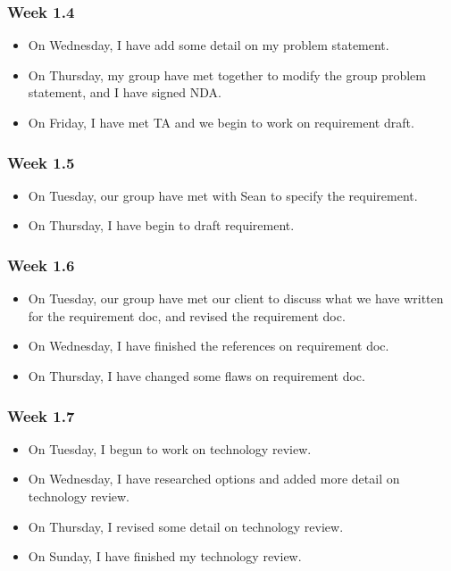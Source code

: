 \documentclass[onecolumn, draftclsnofoot,10pt, compsoc]{article}
\begin{document}
				\subsubsection{Week 1.4}
					\begin{itemize}
					\item On Wednesday, I have add some detail on my problem statement.
					\item On Thursday, my group have met together to modify the group problem statement, and I have signed NDA.
					\item On Friday, I have met TA and we begin to work on requirement draft.
					\end{itemize}
				\subsubsection{Week 1.5}
					\begin{itemize}
					\item On Tuesday, our group have met with Sean to specify the requirement.
					\item On Thursday, I have begin to draft requirement.
					\end{itemize}
				\subsubsection{Week 1.6}
					\begin{itemize}
					\item On Tuesday, our group have met our client to discuss what we have written for the requirement doc, and revised the requirement doc.
					\item On Wednesday, I have finished the references on requirement doc.
					\item On Thursday, I have changed some flaws on requirement doc.
					\end{itemize}
				\subsubsection{Week 1.7}
					\begin{itemize}
					\item On Tuesday, I begun to work on technology review.
					\item On Wednesday, I have researched options and  added more detail on technology review.
					\item On Thursday, I revised some detail on technology review.
					\item On Sunday, I have finished my technology review.
					\end{itemize}
\end{document}
